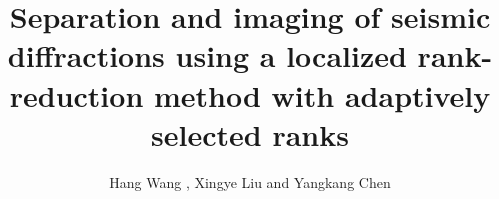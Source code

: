 
\title{Separation and imaging of seismic diffractions using a localized rank-reduction method with adaptively selected ranks}

\renewcommand{\thefootnote}{\fnsymbol{footnote}}

\author{Hang Wang \footnotemark[1], Xingye Liu \footnotemark[2] and Yangkang Chen\footnotemark[1]}


\address{
\footnotemark[1]
Key Laboratory of Geoscience Big Data and Deep Resource of Zhejiang Province\\
School of Earth Sciences\\
Zhejiang University\\
Hangzhou, Zhejiang Province, China, 310027\\
chenyk2016@gmail.com \& 18328504171@163.com\\
\footnotemark[2]
College of Geology and Environment\\
Xi’an University of Science and Technology\\
Xi’an, Shaanxi Province, China, 710054 \\
lwxwyh506673@126.com\\
Corresponding Author: Yangkang Chen (chenyk2016@gmail.com) 
}


\maketitle

\DeclareRobustCommand{\dlo}[1]{}
\DeclareRobustCommand{\wen}[1]{#1}

